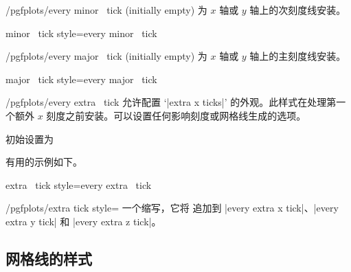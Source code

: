 \begin{xystylekey}{/pgfplots/every minor \x\ tick (initially empty)}
    为 $x$ 轴或 $y$ 轴上的次刻度线安装。
\end{xystylekey}

\pgfplotsshortxystylekey minor \x\ tick style=every minor \x\ tick\pgfeov

\begin{xystylekey}{/pgfplots/every major \x\ tick (initially empty)}
    为 $x$ 轴或 $y$ 轴上的主刻度线安装。
\end{xystylekey}
\pgfplotsshortxystylekey major \x\ tick style=every major \x\ tick\pgfeov

\begin{xystylekey}{/pgfplots/every extra \x\ tick}
    允许配置 `|extra x ticks|' 的外观。此样式在处理第一个额外 $x$ 刻度之前安装。可以设置任何影响刻度或网格线生成的选项。

    初始设置为
\begin{codeexample}
\end{codeexample}

    有用的示例如下。
\begin{codeexample}
\end{codeexample}
\end{xystylekey}

\pgfplotsshortxystylekey extra \x\ tick style=every extra \x\ tick\pgfeov

\begin{stylekey}{/pgfplots/extra tick style=}
    一个缩写，它将  追加到 |every extra x tick|、|every extra y tick| 和 |every extra z tick|。
\end{stylekey}


\subsection*{网格线的样式}

